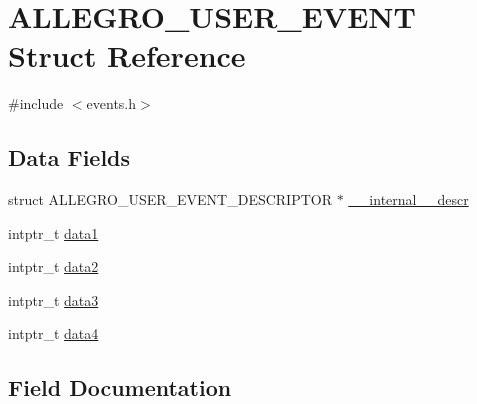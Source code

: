 \hypertarget{struct_a_l_l_e_g_r_o___u_s_e_r___e_v_e_n_t}{}\section{A\+L\+L\+E\+G\+R\+O\+\_\+\+U\+S\+E\+R\+\_\+\+E\+V\+E\+NT Struct Reference}
\label{struct_a_l_l_e_g_r_o___u_s_e_r___e_v_e_n_t}


{\ttfamily \#include $<$events.\+h$>$}

\subsection*{Data Fields}
\begin{DoxyCompactItemize}
\item 
struct A\+L\+L\+E\+G\+R\+O\+\_\+\+U\+S\+E\+R\+\_\+\+E\+V\+E\+N\+T\+\_\+\+D\+E\+S\+C\+R\+I\+P\+T\+OR $\ast$ \hyperlink{struct_a_l_l_e_g_r_o___u_s_e_r___e_v_e_n_t_a564cc6f62dc5a4ac7f920b553c3f72f5}{\+\_\+\+\_\+internal\+\_\+\+\_\+descr}
\item 
intptr\+\_\+t \hyperlink{struct_a_l_l_e_g_r_o___u_s_e_r___e_v_e_n_t_a3370ccedddd73baee2cda0e5a5aeb1b3}{data1}
\item 
intptr\+\_\+t \hyperlink{struct_a_l_l_e_g_r_o___u_s_e_r___e_v_e_n_t_a4f897f2cb62cd1a995c965729dfc8474}{data2}
\item 
intptr\+\_\+t \hyperlink{struct_a_l_l_e_g_r_o___u_s_e_r___e_v_e_n_t_a208377fb4e74e1d46e66381e88e5a931}{data3}
\item 
intptr\+\_\+t \hyperlink{struct_a_l_l_e_g_r_o___u_s_e_r___e_v_e_n_t_ad6ff01a2ccdf261c0863b694737c5323}{data4}
\end{DoxyCompactItemize}


\subsection{Field Documentation}
\mbox{\label{struct_a_l_l_e_g_r_o___u_s_e_r___e_v_e_n_t_a564cc6f62dc5a4ac7f920b553c3f72f5}} 
